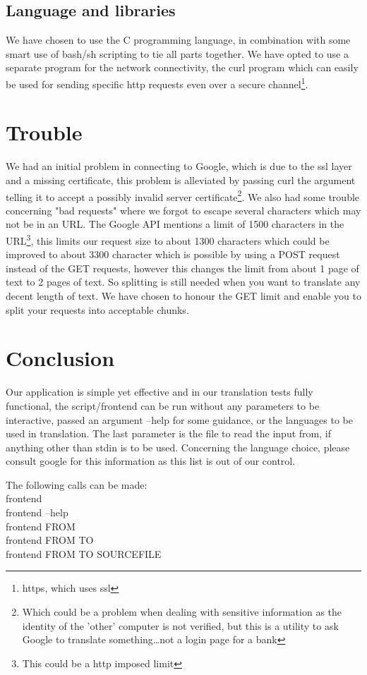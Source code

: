\documentclass[a4paper]{article}
\begin{document}
\subsection{Language and libraries}
We have chosen to use the C programming language, in combination with some smart
use of bash/sh scripting to tie all parts together. We have opted to use a
separate program for the network connectivity, the curl program which can
easily be used for sending specific http requests even over a secure
channel\footnote{https, which uses ssl}. 
\section{Trouble}
We had an initial problem in connecting to Google, which is due to the ssl layer
and a missing certificate, this problem is alleviated by passing curl the
argument telling it to accept a possibly invalid server
certificate\footnote{Which could be a problem when dealing with sensitive
information as the identity of the 'other' computer is not verified, but this is
a utility to ask Google to translate something\ldots not a login page for a
bank}. We also had some trouble concerning "bad requests" where we forgot to
escape several characters which may not be in an URL. The Google API mentions a
limit of 1500 characters in the URL\footnote{This could be a http imposed
limit}, this limits our request size to about 1300 characters which could be
improved to about 3300 character which is possible by using a POST request
instead of the GET requests, however this changes the limit from about 1 page of
text to 2 pages of text. So splitting is still needed when you want to translate
any decent length of text. We have chosen to honour the GET limit and enable you
to split your requests into acceptable chunks.
\section{Conclusion}
Our application is simple yet effective and in our translation tests fully
functional, the script/frontend can be run without any parameters to be
interactive, passed an argument --help for some guidance, or the languages to be
used in translation. The last parameter is the file to read the input from, if
anything other than stdin is to be used. Concerning the language choice, please
consult google for this information as this list is out of our control. 

The following calls can be made:\\
frontend\\
frontend --help\\
frontend FROM\\
frontend FROM TO\\
frontend FROM TO SOURCEFILE\\
\appendix
\end{document}
